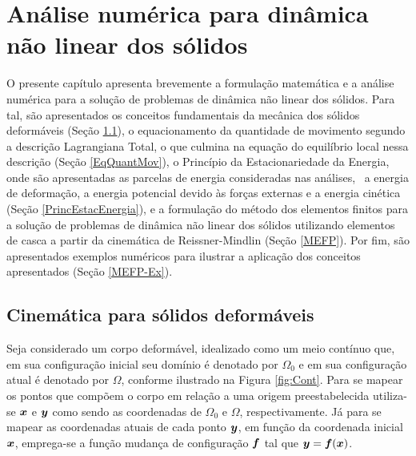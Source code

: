 \chapter{Análise numérica para dinâmica não linear dos sólidos} \label{EGDS}

O presente capítulo apresenta brevemente a formulação matemática e a análise numérica para a solução de problemas de dinâmica não linear dos sólidos. Para tal, são apresentados os conceitos fundamentais da mecânica dos sólidos deformáveis (Seção \ref{CinSolDef}), o equacionamento da quantidade de movimento segundo a descrição Lagrangiana Total, o que culmina na equação do equilíbrio local nessa descrição (Seção \ref{EqQuantMov}), o Princípio da Estacionariedade da Energia, onde são apresentadas as parcelas de energia consideradas nas análises, \ie\ a energia de deformação, a energia potencial devido às forças externas e a energia cinética (Seção \ref{PrincEstacEnergia}), e a formulação do método dos elementos finitos para a solução de problemas de dinâmica não linear dos sólidos utilizando elementos de casca a partir da cinemática de Reissner-Mindlin (Seção \ref{MEFP}). Por fim, são apresentados exemplos numéricos para ilustrar a aplicação dos conceitos apresentados (Seção \ref{MEFP-Ex}).

\section{Cinemática para sólidos deformáveis} \label{CinSolDef}

Seja considerado um corpo deformável, idealizado como um meio contínuo que, em sua configuração inicial seu domínio é denotado por $\Omega_0$ e em sua configuração atual é denotado por $\Omega$, conforme ilustrado na Figura \ref{fig:Cont}. Para se mapear os pontos que compõem o corpo em relação a uma origem preestabelecida utiliza-se $\boldsymbol{x}$ e $\boldsymbol{y}$ como sendo as coordenadas de $\Omega_0$ e $\Omega$, respectivamente. Já para se mapear as coordenadas atuais de cada ponto $\boldsymbol{y}$, em função da coordenada inicial $\boldsymbol{x}$, emprega-se a função mudança de configuração $\boldsymbol{f}$ tal que $\boldsymbol{y}=\boldsymbol{f}(\boldsymbol{x})$.

